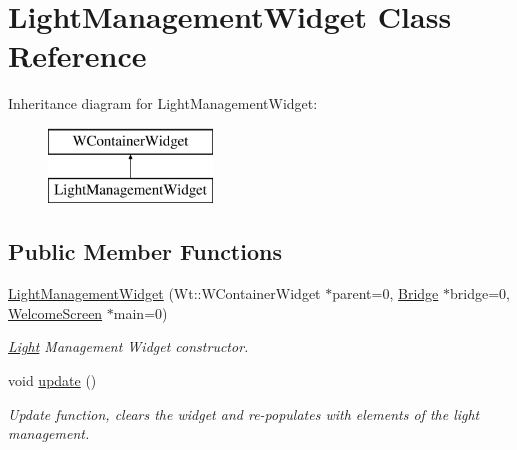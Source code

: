 \hypertarget{classLightManagementWidget}{}\section{Light\+Management\+Widget Class Reference}
\label{classLightManagementWidget}
Inheritance diagram for Light\+Management\+Widget\+:\begin{figure}[H]
\begin{center}
\leavevmode
\includegraphics[height=2.000000cm]{classLightManagementWidget}
\end{center}
\end{figure}
\subsection*{Public Member Functions}
\begin{DoxyCompactItemize}
\item 
\hyperlink{classLightManagementWidget_a322acb2556f7ce22b997d32cbc23344b}{Light\+Management\+Widget} (Wt\+::\+W\+Container\+Widget $\ast$parent=0, \hyperlink{classBridge}{Bridge} $\ast$bridge=0, \hyperlink{classWelcomeScreen}{Welcome\+Screen} $\ast$main=0)
\begin{DoxyCompactList}\small\item\em \hyperlink{classLight}{Light} Management Widget constructor. \end{DoxyCompactList}\item 
void \hyperlink{classLightManagementWidget_adc85e9100ac03e670cf0a9dc5d271058}{update} ()
\begin{DoxyCompactList}\small\item\em Update function, clears the widget and re-\/populates with elements of the light management. \end{DoxyCompactList}\end{DoxyCompactItemize}
